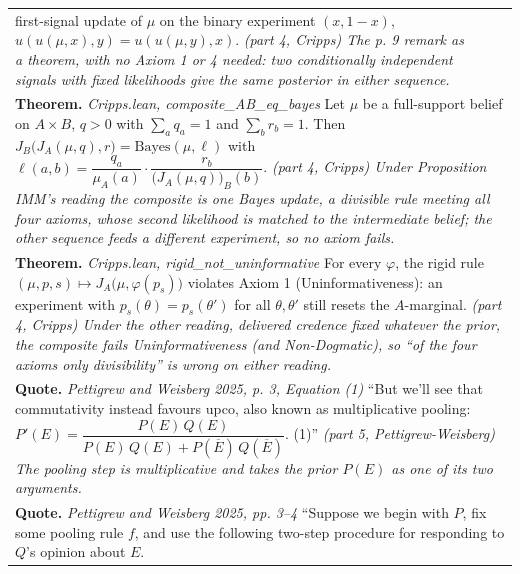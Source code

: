 \documentclass[10pt]{article}
\theoremstyle{definition}
\newlength{\fullw}\setlength{\fullw}{25.9cm}
\begin{document}
{\begin{longtable}{|p{0.9cm}|p{12.2cm}|p{12.2cm}|}
{first-signal update of $\mu$ on the binary experiment $(x, 1-x)$,
$u(u(\mu,x),y) = u(u(\mu,y),x)$. \newline \textit{(part 4, Cripps) The p. 9 remark as a theorem, with no Axiom 1
or 4 needed: two conditionally independent signals with fixed likelihoods
give the same posterior in either sequence.}} \\
\multicolumn{3}{|p{\fullw}|}{\textbf{Theorem.} \textit{Cripps.lean, composite\_AB\_eq\_bayes} \newline Let $\mu$ be a full-support belief on $A \times B$, $q > 0$ with
$\sum_a q_a = 1$ and $\sum_b r_b = 1$. Then
$J_B\big(J_A(\mu,q),r\big) = \mathrm{Bayes}(\mu, \ell)$ with
$\ell(a,b) = \dfrac{q_a}{\mu_A(a)} \cdot \dfrac{r_b}{\big(J_A(\mu,q)\big)_B(b)}$. \newline \textit{(part 4, Cripps) Under Proposition IMM's reading the composite
is one Bayes update, a divisible rule meeting all four axioms, whose second
likelihood is matched to the intermediate belief; the other sequence feeds a
different experiment, so no axiom fails.}} \\
\multicolumn{3}{|p{\fullw}|}{\textbf{Theorem.} \textit{Cripps.lean, rigid\_not\_uninformative} \newline For every $\varphi$, the rigid rule
$(\mu, p, s) \mapsto J_A\big(\mu, \varphi(p_s)\big)$ violates Axiom 1
(Uninformativeness): an experiment with $p_s(\theta) = p_s(\theta')$ for all
$\theta, \theta'$ still resets the $A$-marginal. \newline \textit{(part 4, Cripps) Under the other reading, delivered credence
fixed whatever the prior, the composite fails Uninformativeness (and
Non-Dogmatic), so ``of the four axioms only divisibility'' is wrong on either
reading.}} \\
\multicolumn{3}{|p{\fullw}|}{\textbf{Quote.} \textit{Pettigrew and Weisberg 2025, p. 3, Equation (1)} \newline ``But we'll see that commutativity instead favours upco, also
known as multiplicative pooling:
$P'(E) = \dfrac{P(E)\,Q(E)}{P(E)\,Q(E) + P(\overline{E})\,Q(\overline{E})}$. (1)'' \newline \textit{(part 5, Pettigrew-Weisberg) The pooling step is multiplicative
and takes the prior $P(E)$ as one of its two arguments.}} \\
\multicolumn{3}{|p{\fullw}|}{\textbf{Quote.} \textit{Pettigrew and Weisberg 2025, pp. 3--4} \newline ``Suppose we begin with $P$, fix some pooling rule $f$, and use the
following two-step procedure for responding to $Q$'s opinion about $E$.
}
\end{longtable}}
\end{document}
